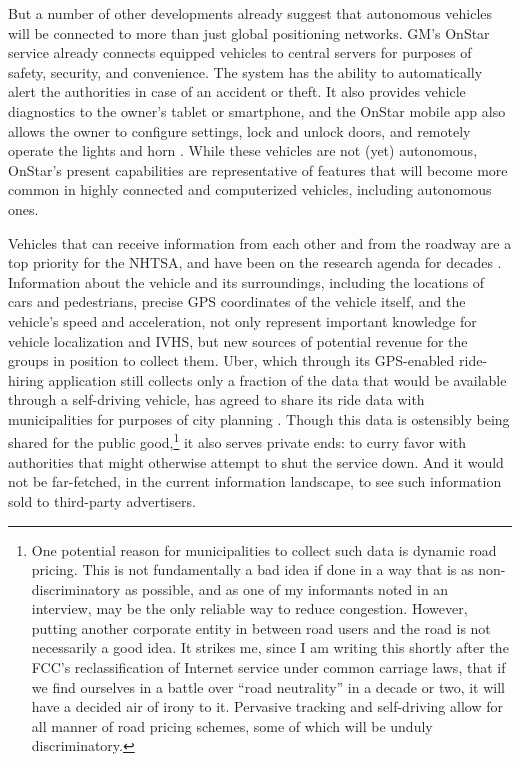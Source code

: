 But a number of other developments already suggest that autonomous
vehicles will be connected to more than just global positioning
networks. GM's OnStar service already connects equipped vehicles to central servers for
purposes of safety, security, and convenience. The system has the
ability to automatically alert the authorities in case of an accident
or theft. It also provides vehicle diagnostics to the owner's tablet
or smartphone, and the OnStar mobile app also allows the owner to
configure settings, lock and 
unlock doors, and remotely operate the lights and horn \cite{onstar}.
While these vehicles are not (yet) autonomous, OnStar's present
capabilities are representative of features that will become more common in highly
connected and computerized vehicles, including autonomous ones.



Vehicles that can receive information from each other and from the
roadway are a top priority for the NHTSA, and have been on the
research agenda for decades \cite[p. 11]{wetmore}.
Information about the vehicle
and its surroundings, including the locations of cars and pedestrians,
precise GPS coordinates of the vehicle itself, and the vehicle's speed
and acceleration, not only represent important knowledge for
vehicle localization and IVHS, but new sources of potential
revenue for the groups in position to collect them. Uber, which
through its GPS-enabled ride-hiring application still collects only a
fraction of the data that would be available through a self-driving
vehicle, has agreed to share its ride data with municipalities for purposes of
city planning \cite{uberJardin}. Though this data is ostensibly being
shared for the public good,\footnote{One potential reason for municipalities to
  collect such data is dynamic road pricing. This is not fundamentally
a bad idea if done in a way that is as non-discriminatory as possible,
and as one of my informants noted in an interview, may be 
the only reliable way to reduce congestion. However, putting another
corporate entity in between road users and the road is not necessarily
a good idea. It strikes me, since I am writing this shortly after the
FCC's reclassification of Internet service under common carriage laws,
that if we find ourselves in a battle over ``road neutrality'' in a
decade or two, it will have a decided air of irony to it. Pervasive
tracking and self-driving allow for all manner of road pricing
schemes, some of which will be unduly discriminatory.} it also serves private ends:  to curry favor with
authorities that might otherwise attempt to shut the service down. And it would
not be far-fetched, in the current 
information landscape, to see such information sold to third-party advertisers.

